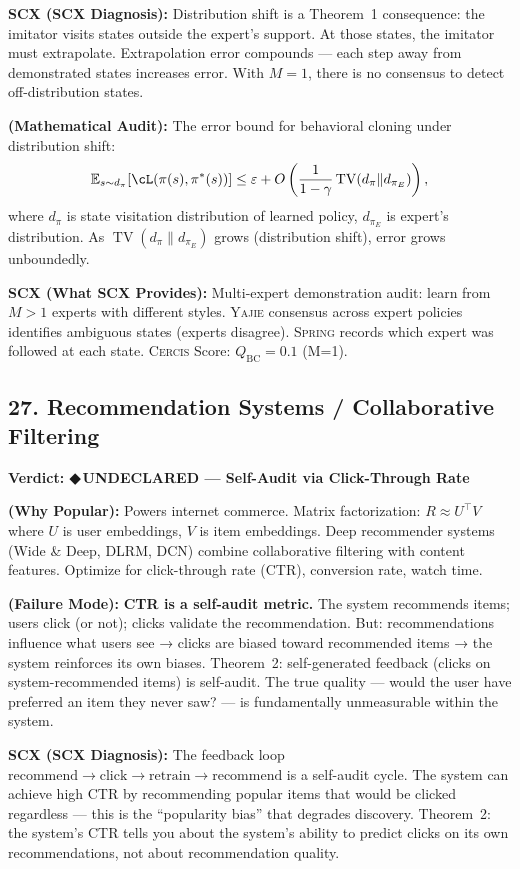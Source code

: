 \documentclass[12pt,a4paper]{article}
\theoremstyle{definition}
\newcommand{\guilty}{{\color{guiltycolor}\textbf{◆\,UNDECLARED}}}
\newcommand{\Yajie}{\textsc{Yajie}}
\newcommand{\Spring}{\textsc{Spring}}
\newcommand{\Cercis}{\textsc{Cercis}}
\DeclareMathOperator{\TV}{TV}
\newcommand{\E}{\mathbb{E}}
\newcommand{\auditHeader}[1]{\medskip\noindent\textbf{\large #1}\medskip}
\newcommand{\whyPopular}{\noindent\textbf{ (Why Popular):} }
\newcommand{\whyFail}{\noindent\textbf{ (Failure Mode):} }
\newcommand{\whatMissing}{\noindent\textbf{SCX (What SCX Provides):} }
\newcommand{\diagnosis}{\noindent\textbf{SCX (SCX Diagnosis):} }
\newcommand{\mathAudit}{\noindent\textbf{ (Mathematical Audit):} }
\begin{document}
\diagnosis{} Distribution shift is a Theorem~1 consequence: the imitator visits states outside the expert's support. At those states, the imitator must extrapolate. Extrapolation error compounds — each step away from demonstrated states increases error. With $M=1$, there is no consensus to detect off-distribution states.

\mathAudit{} The error bound for behavioral cloning under distribution shift:
\[
\E_{s \sim d_\pi}[\cL(\pi(s), \pi^*(s))] \le \varepsilon + O\left(\frac{1}{1-\gamma}\TV(d_\pi \| d_{\pi_E})\right),
\]
where $d_\pi$ is state visitation distribution of learned policy, $d_{\pi_E}$ is expert's distribution. As $\TV(d_\pi \| d_{\pi_E})$ grows (distribution shift), error grows unboundedly.

\whatMissing{} Multi-expert demonstration audit: learn from $M>1$ experts with different styles. \Yajie{} consensus across expert policies identifies ambiguous states (experts disagree). \Spring{} records which expert was followed at each state. \Cercis{} Score: $Q_{\text{BC}} = 0.1$ (M=1).

\subsection{27. Recommendation Systems / Collaborative Filtering }

\auditHeader{Verdict: \guilty{} — Self-Audit via Click-Through Rate}

\whyPopular{} Powers internet commerce. Matrix factorization: $R \approx U^\top V$ where $U$ is user embeddings, $V$ is item embeddings. Deep recommender systems (Wide \& Deep, DLRM, DCN) combine collaborative filtering with content features. Optimize for click-through rate (CTR), conversion rate, watch time.

\whyFail{} \textbf{CTR is a self-audit metric.} The system recommends items; users click (or not); clicks validate the recommendation. But: recommendations influence what users see → clicks are biased toward recommended items → the system reinforces its own biases. Theorem~2: self-generated feedback (clicks on system-recommended items) is self-audit. The true quality — would the user have preferred an item they never saw? — is fundamentally unmeasurable within the system.

\diagnosis{} The feedback loop $\text{recommend} \to \text{click} \to \text{retrain} \to \text{recommend}$ is a self-audit cycle. The system can achieve high CTR by recommending popular items that would be clicked regardless — this is the ``popularity bias'' that degrades discovery. Theorem~2: the system's CTR tells you about the system's ability to predict clicks on its own recommendations, not about recommendation quality.
\end{document}
